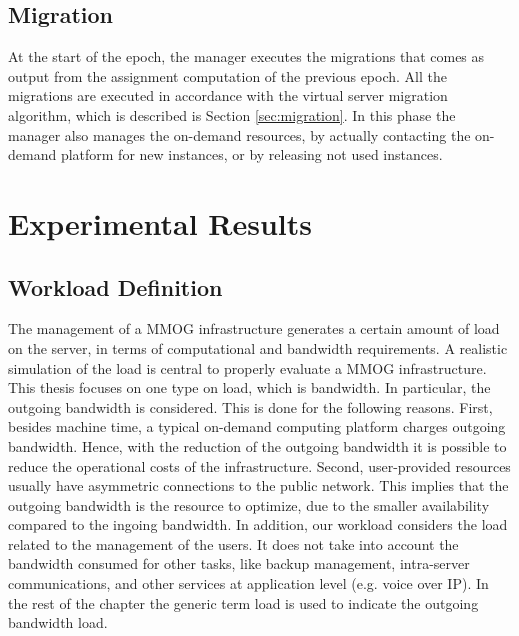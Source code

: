 \documentclass[final,10pt,a5paper]{phdimt}
\theoremstyle{definition}
\begin{document}
\subsection{Migration}

At the start of the epoch, the manager executes the migrations that comes as output from the assignment computation of the previous epoch. All the migrations are executed in accordance with the virtual server migration algorithm, which is described is Section \ref{sec:migration}.
In this phase the manager also manages the on-demand resources, by actually contacting the on-demand platform for new instances, or by releasing not used instances.








\section{Experimental Results}
\label{sec:result}




\subsection{Workload Definition}
\label{sec:workload}





The management of a MMOG infrastructure generates a certain amount of load on the server, in terms of computational and bandwidth requirements.
A realistic simulation of the load is central to properly evaluate a MMOG infrastructure.
This thesis focuses on one type on load, which is bandwidth.
In particular, the outgoing bandwidth is considered.
This is done for the following reasons.
First, besides machine time, a typical on-demand computing platform charges outgoing bandwidth.
Hence, with the reduction of the outgoing bandwidth it is possible to reduce the operational costs of the infrastructure.
Second, user-provided resources usually have asymmetric connections to the public network.
This implies that the outgoing bandwidth is the resource to optimize, due to the smaller availability compared to the ingoing bandwidth. 
In addition, our workload considers the load related to the management of the users. It does not take into account the bandwidth consumed for other tasks, like backup management, intra-server communications, and other services at application level (e.g. voice over IP).  
In the rest of the chapter the generic term load is used to indicate the outgoing bandwidth load.
\end{document}
